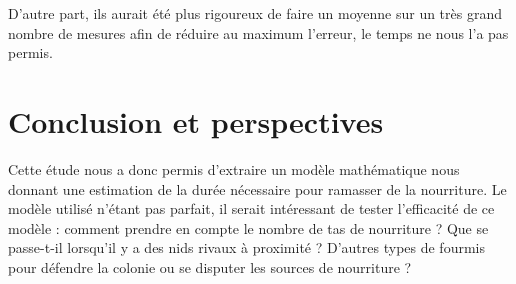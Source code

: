 \documentclass{article}
\begin{document}
D'autre part, ils aurait été plus rigoureux de faire un moyenne sur un très grand nombre de mesures afin de réduire au maximum l'erreur, le temps ne nous l'a pas permis. 

\section*{Conclusion et perspectives}
Cette étude nous a donc permis d'extraire un modèle mathématique nous donnant une estimation de la durée nécessaire pour ramasser de la nourriture. Le modèle utilisé n'étant pas parfait, il serait intéressant de tester l'efficacité de ce modèle : comment prendre en compte le nombre de tas de nourriture ? Que se passe-t-il lorsqu'il y a des nids rivaux à proximité ? D'autres types de fourmis pour défendre la colonie ou se disputer les sources de nourriture ?
\end{document}
